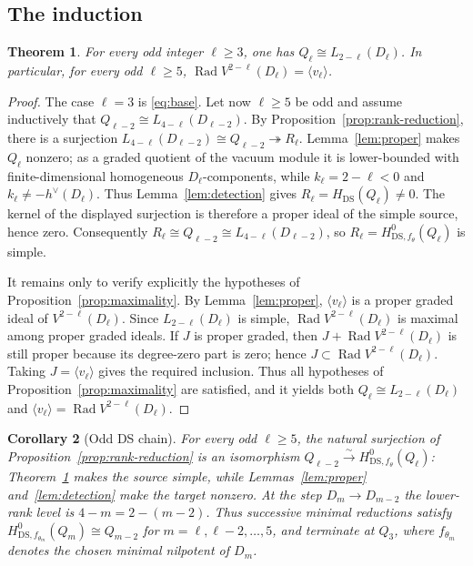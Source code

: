 \documentclass[11pt]{article}
\newtheorem{theorem}{Theorem}[section]
\newtheorem{corollary}[theorem]{Corollary}
\newcommand{\Rad}{\operatorname{Rad}}
\begin{document}
\subsection{The induction}

\begin{theorem}\label{thm:odd}
For every odd integer $\ell\ge3$, one has
$Q_\ell\cong L_{2-\ell}(D_\ell)$.  In particular, for every odd
$\ell\ge5$, $\Rad V^{2-\ell}(D_\ell)=\langle v_\ell\rangle$.
\end{theorem}

\begin{proof}
The case $\ell=3$ is \eqref{eq:base}.  Let now $\ell\ge5$ be odd and assume
inductively that $Q_{\ell-2}\cong L_{4-\ell}(D_{\ell-2})$.  By
Proposition~\ref{prop:rank-reduction}, there is a surjection
$L_{4-\ell}(D_{\ell-2})\cong Q_{\ell-2}\twoheadrightarrow R_\ell$.
Lemma~\ref{lem:proper} makes $Q_\ell$ nonzero; as a graded quotient of the
vacuum module it is lower-bounded with finite-dimensional homogeneous
$D_\ell$-components, while $k_\ell=2-\ell<0$ and
$k_\ell\ne-h^\vee(D_\ell)$.  Thus Lemma~\ref{lem:detection} gives
$R_\ell=H_{\mathrm{DS}}(Q_\ell)\ne0$.  The kernel of the displayed
surjection is therefore a proper ideal of the simple source, hence zero.
Consequently $R_\ell\cong Q_{\ell-2}\cong L_{4-\ell}(D_{\ell-2})$, so
$R_\ell=H^0_{\mathrm{DS},f_\theta}(Q_\ell)$ is simple.

It remains only to verify explicitly the hypotheses of
Proposition~\ref{prop:maximality}.  By Lemma~\ref{lem:proper},
$\langle v_\ell\rangle$ is a proper graded ideal of
$V^{2-\ell}(D_\ell)$.  Since $L_{2-\ell}(D_\ell)$ is simple, $\Rad V^{2-\ell}(D_\ell)$ is
maximal among proper graded ideals.  If $J$ is proper graded, then
$J+\Rad V^{2-\ell}(D_\ell)$ is still proper because its degree-zero part is
zero; hence $J\subset\Rad V^{2-\ell}(D_\ell)$.  Taking
$J=\langle v_\ell\rangle$ gives the required inclusion.
Thus all hypotheses of Proposition~\ref{prop:maximality} are satisfied, and
it yields both $Q_\ell\cong L_{2-\ell}(D_\ell)$ and
$\langle v_\ell\rangle=\Rad V^{2-\ell}(D_\ell)$.
\end{proof}

\begin{corollary}[Odd DS chain]\label{cor:odd-chain}
For every odd $\ell\ge5$, the natural surjection of
Proposition~\ref{prop:rank-reduction} is an isomorphism
$Q_{\ell-2}\xrightarrow{\sim}H^0_{\mathrm{DS},f_\theta}(Q_\ell)$:
Theorem~\ref{thm:odd} makes the source simple, while
Lemmas~\ref{lem:proper} and~\ref{lem:detection} make the target nonzero.
At the step $D_m\to D_{m-2}$ the lower-rank level is
$4-m=2-(m-2)$.  Thus successive minimal reductions satisfy
$H^0_{\mathrm{DS},f_{\theta_m}}(Q_m)\cong Q_{m-2}$ for
$m=\ell,\ell-2,\ldots,5$, and terminate at $Q_3$, where $f_{\theta_m}$
denotes the chosen minimal nilpotent of $D_m$.
\end{corollary}
\end{document}
